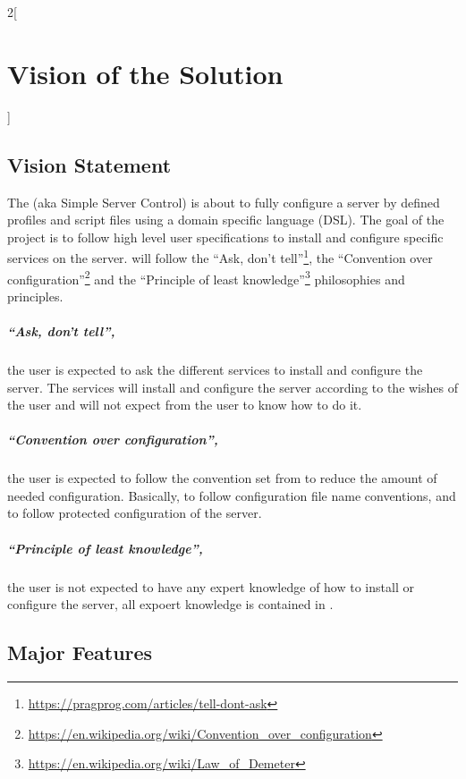 \begin{multicols}{2}[\chapter{Vision of the Solution}]

\section{Vision Statement}

The \AppName{} (aka Simple Server Control) is about to fully configure a 
server by defined profiles and script files using a domain specific language
(DSL). The goal of the project is to follow high level user specifications
to install and configure specific services on the server. \AppName{}
will follow the ``Ask, don't tell''\footnote{\url{https://pragprog.com/articles/tell-dont-ask}}, 
the ``Convention over configuration''\footnote{\url{https://en.wikipedia.org/wiki/Convention_over_configuration}} 
and the ``Principle of least knowledge''\footnote{\url{https://en.wikipedia.org/wiki/Law_of_Demeter}} 
philosophies and principles.

\paragraph{``Ask, don't tell'',}
the user is expected to ask the different \AppName{} services to install and 
configure the server. The services will install and 
configure the server according to the wishes of the user and will not expect
from the user to know how to do it. 

\paragraph{``Convention over configuration'',}
the user is expected to follow the convention set from \AppName{} to reduce
the amount of needed configuration. Basically, to follow configuration
file name conventions, and to follow protected configuration of the server.

\paragraph{``Principle of least knowledge'',}
the user is not expected to have any expert knowledge of how to install or 
configure the server, all expoert knowledge is contained in \AppName{}.

\section{Major Features}


\end{multicols}
